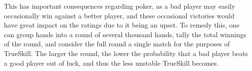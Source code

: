This has important consequences regarding poker, as a bad player may easily occasionally win against a better player, and these occasional victories would have great impact on the ratings due to it being an upset. To remedy this, one can group hands into a round of several thousand hands, tally the total winnings of the round, and consider the full round a single match for the purposes of TrueSkill. The larger the round, the lower the probability that a bad player beats a good player out of luck, and thus the less unstable TrueSkill becomes.